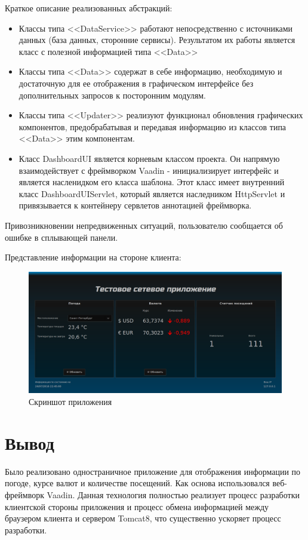 \documentclass{article}
\begin{document}
Краткое описание реализованных абстракций:
\begin{itemize}
\item Классы типа <<DataService>> работают непосредственно с источниками данных (база данных, сторонние сервисы). Результатом их работы является класс с полезной информацией типа <<Data>>
\item Классы типа <<Data>> содержат в себе информацию, необходимую и достаточную для ее отображения в графическом интерфейсе без дополнительных запросов к посторонним модулям.
\item Классы типа <<Updater>> реализуют функционал обновления графических компонентов, предобрабатывая и передавая информацию из классов типа <<Data>> этим компонентам.
\item Класс DashboardUI является корневым классом проекта. Он напрямую взаимодействует с фреймворком Vaadin - инициализирует интерфейс и является насленидком его класса шаблона. Этот класс имеет внутренний класс DashboardUIServlet, который является 
наследником HttpServlet и привязывается к контейнеру сервлетов аннотацией фреймворка.
\end{itemize}

Привозникновении непредвиженных ситуаций, пользователю сообщается 
об ошибке в сплывающей панели.

Представление информации на стороне клиента:

\begin{figure}[h]
\centering
\includegraphics[width=\textwidth]{screenshot}
\caption{Скриншот приложения}
\end{figure}

\section*{Вывод}
Было реализовано одностраничное приложение для отображения информации по погоде, курсе валют и количестве посещений.
Как основа использовался веб-фреймворк Vaadin. Данная технология 
полностью реализует процесс разработки клиентской стороны приложения
и процесс обмена информацией между браузером клиента и сервером Tomcat8, что существенно ускоряет процесс разработки.
\pagebreak
\end{document}

